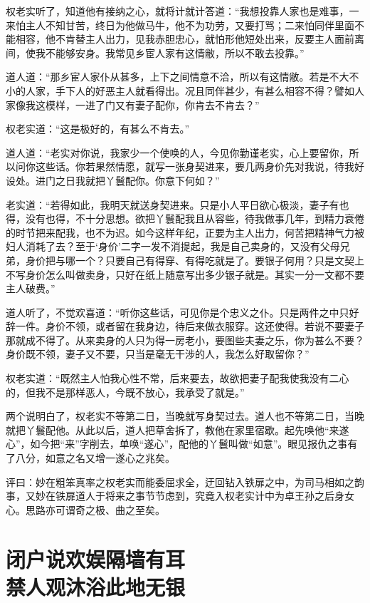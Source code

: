 \documentclass[a4paper,12pt,UTF8,twoside]{ctexbook}
\begin{document}
权老实听了，知道他有接纳之心，就将计就计答道：“我想投靠人家也是难事，一来怕主人不知甘苦，终日为他做马牛，他不为功劳，又要打骂；二来怕同伴里面不能相容，他不肯替主人出力，见我赤胆忠心，就怕形他短处出来，反要主人面前离间，使我不能够安身。我常见乡宦人家有这情敝，所以不敢去投靠。”

道人道：“那乡宦人家仆从甚多，上下之间情意不洽，所以有这情敝。若是不大不小的人家，手下人的好恶主人就看得出。况且同伴甚少，有甚么相容不得？譬如人家像我这模样，一进了门又有妻子配你，你肯去不肯去？”

权老实道：“这是极好的，有甚么不肯去。”

道人道：“老实对你说，我家少一个使唤的人，今见你勤谨老实，心上要留你，所以问你这些话。你若果然情愿，就写一张身契进来，要几两身价先对我说，待我好设处。进门之日我就把丫鬟配你。你意下何如？”

老实道：“若得如此，我明天就送身契进来。只是小人平日欲心极淡，妻子有也得，没有也得，不十分思想。欲把丫鬟配我且从容些，待我做事几年，到精力衰倦的时节把来配我，也不为迟。如今这样年纪，正要为主人出力，何苦把精神气力被妇人消耗了去？至于‘身价’二字一发不消提起，我是自己卖身的，又没有父母兄弟，身价把与哪一个？只要自己有得穿、有得吃就是了。要银子何用？只是文契上不写身价怎么叫做卖身，只好在纸上随意写出多少银子就是。其实一分一文都不要主人破费。”

道人听了，不觉欢喜道：“听你这些话，可见你是个忠义之仆。只是两件之中只好辞一件。身价不领，或者留在我身边，待后来做衣服穿。这还使得。若说不要妻子那就成不得了。从来卖身的人只为得一房老小，要图些夫妻之乐，你为甚么不要？身价既不领，妻子又不要，只当是毫无干涉的人，我怎么好取留你？”

权老实道：“既然主人怕我心性不常，后来要去，故欲把妻子配我使我没有二心的，但我不是那样恶人，今既不放心，我承受了就是。”

两个说明白了，权老实不等第二日，当晚就写身契过去。道人也不等第二日，当晚就把丫鬟配他。从此以后，道人把草舍拆了，教他在家里宿歇。起先唤他“来遂心”，如今把“来”字削去，单唤“遂心”，配他的丫鬟叫做“如意”。眼见报仇之事有了八分，如意之名又增一遂心之兆矣。

评曰：妙在粗笨真率之权老实而能委屈求全，迂回钻入铁扉之中，为司马相如之韵事，又妙在铁扉道人于将来之事节节虑到，究竟入权老实计中为卓王孙之后身女心。思路亦可谓奇之极、曲之至矣。

\chapter[闭户说欢娱隔墙有耳\ 禁人观沐浴此地无银]{闭户说欢娱隔墙有耳\\禁人观沐浴此地无银}
\end{document}
